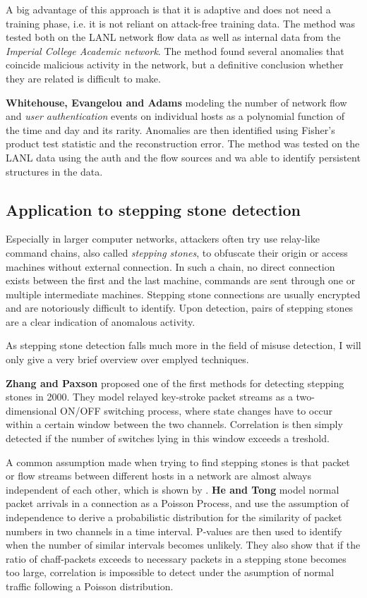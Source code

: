 \documentclass[a4paper,12pt,twoside]{report}
\begin{document}
A big advantage of this approach is that it is adaptive and does not need a training phase, i.e. it is not reliant on attack-free training data. The method was tested both on the LANL network flow data as well as internal data from the \textit{Imperial College Academic network}. The method found several anomalies that coincide malicious activity in the network, but a definitive conclusion whether they are related is difficult to make.

\textbf{Whitehouse, Evangelou and Adams} \cite{whitehouse_activity-based_2016} modeling the number of 
network flow and \textit{user authentication} events on individual hosts as a polynomial function of the time and day and its rarity. Anomalies are then identified using Fisher's product test statistic and the reconstruction error. The method was tested on the LANL data using the auth and the flow sources and wa able to identify persistent structures in the data. 


\subsection{Application to stepping stone detection}

Especially in larger computer networks, attackers often try use relay-like command chains, also called \textit{stepping stones}, to obfuscate their origin or access machines without external connection. In such a chain, no direct connection exists between the first and the last machine, commands are sent through one or multiple intermediate machines. Stepping stone connections are usually encrypted and are notoriously difficult to identify. Upon detection, pairs of stepping stones are a clear indication of anomalous activity. 

As stepping stone detection falls much more in the field of misuse detection, I will only give a very brief overview over emplyed techniques.

\textbf{Zhang and Paxson} \cite{zhang2000detecting} proposed one of the first methods for detecting stepping stones in 2000. They model relayed key-stroke packet streams as a two-dimensional ON/OFF switching process, where state changes have to occur within a certain window between the two channels. Correlation is then simply detected if the number of switches lying in this window exceeds a treshold. 


A common assumption made when trying to find stepping stones is that packet or flow streams between different hosts in a network are almost always independent of each other, which is shown by \cite{neil2013scan}. \textbf{He and Tong}\cite{he2007detecting} model normal packet arrivals in a connection as a Poisson Process, and use the assumption of independence to derive a probabilistic distribution for the similarity of packet numbers in two channels in a time interval. P-values are then used to identify when the number of similar intervals becomes unlikely. They also show that if the ratio of chaff-packets exceeds to necessary packets in a stepping stone becomes too large, correlation is impossible to detect under the asumption of normal traffic following a Poisson distribution.
\end{document}
